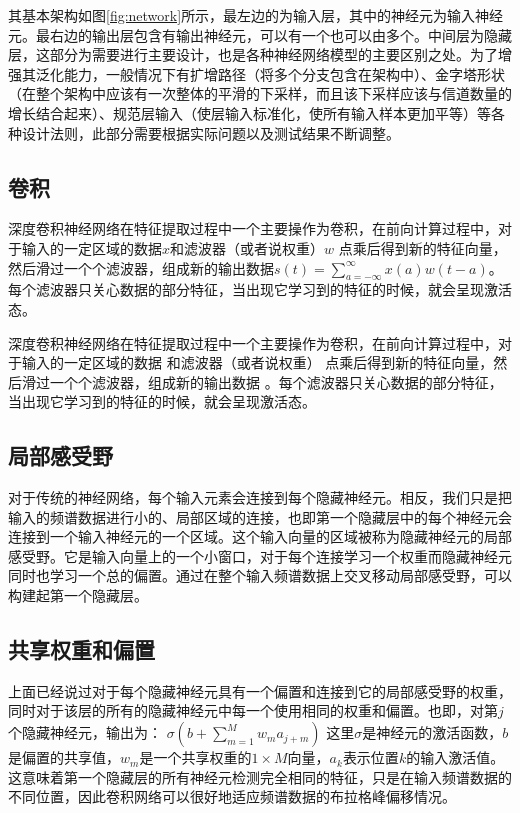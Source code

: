 其基本架构如图\ref{fig:network}所示，最左边的为输入层，其中的神经元为输入神经元。最右边的输出层包含有输出神经元，可以有一个也可以由多个。中间层为隐藏层，这部分为需要进行主要设计，也是各种神经网络模型的主要区别之处。为了增强其泛化能力，一般情况下有扩增路径（将多个分支包含在架构中）、金字塔形状（在整个架构中应该有一次整体的平滑的下采样，而且该下采样应该与信道数量的增长结合起来）、规范层输入（使层输入标准化，使所有输入样本更加平等）等各种设计法则，此部分需要根据实际问题以及测试结果不断调整。

\subsection{卷积}
深度卷积神经网络在特征提取过程中一个主要操作为卷积，在前向计算过程中，对于输入的一定区域的数据$x$和滤波器（或者说权重）$w$ 点乘后得到新的特征向量，然后滑过一个个滤波器，组成新的输出数据$s(t)=\sum_{a=-\infty}^{\infty}x(a)w(t-a) $。每个滤波器只关心数据的部分特征，当出现它学习到的特征的时候，就会呈现激活态。

深度卷积神经网络在特征提取过程中一个主要操作为卷积，在前向计算过程中，对于输入的一定区域的数据 和滤波器（或者说权重） 点乘后得到新的特征向量，然后滑过一个个滤波器，组成新的输出数据 。每个滤波器只关心数据的部分特征，当出现它学习到的特征的时候，就会呈现激活态。

\subsection{局部感受野}
对于传统的神经网络，每个输入元素会连接到每个隐藏神经元。相反，我们只是把输入的频谱数据进行小的、局部区域的连接，也即第一个隐藏层中的每个神经元会连接到一个输入神经元的一个区域。这个输入向量的区域被称为隐藏神经元的局部感受野。它是输入向量上的一个小窗口，对于每个连接学习一个权重而隐藏神经元同时也学习一个总的偏置。通过在整个输入频谱数据上交叉移动局部感受野，可以构建起第一个隐藏层。

\subsection{共享权重和偏置}
上面已经说过对于每个隐藏神经元具有一个偏置和连接到它的局部感受野的权重，同时对于该层的所有的隐藏神经元中每一个使用相同的权重和偏置。也即，对第$j$个隐藏神经元，输出为：
$\sigma(b+\sum_{m=1}^M w_m a_{j+m}) $
这里$\sigma$是神经元的激活函数，$b$是偏置的共享值，$w_m$是一个共享权重的$1\times M$向量，$a_k$表示位置$k$的输入激活值。这意味着第一个隐藏层的所有神经元检测完全相同的特征，只是在输入频谱数据的不同位置，因此卷积网络可以很好地适应频谱数据的布拉格峰偏移情况。

